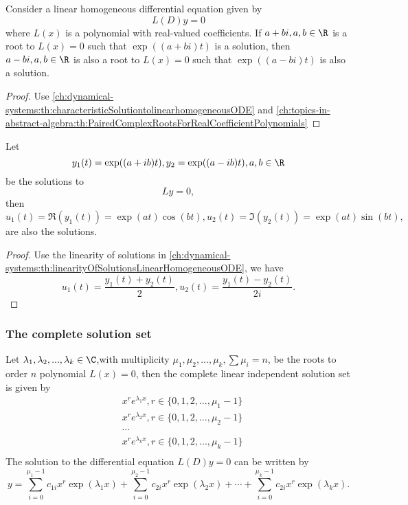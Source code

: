 \begin{refsection}
\begin{lemma}
Consider a linear homogeneous differential equation given by
$$L(D)y = 0$$	
where $L(x)$ is a polynomial with real-valued coefficients. 
If $a+bi,a,b\in \R$ is a root to $L(x) = 0$ such that $\exp((a+bi)t)$ is a solution, then
 $a-bi,a,b\in \R$ is also a root to $L(x) = 0$ such that $\exp((a-bi)t)$ is also a solution.
\end{lemma}
\begin{proof}
Use	
\autoref{ch:dynamical-systems:th:characteristicSolutiontolinearhomogeneousODE} and \autoref{ch:topics-in-abstract-algebra:th:PairedComplexRootsForRealCoefficientPolynomials}
\end{proof}



\begin{lemma}\label{ch:dynamical-systems:th:ConversionTrigonometricFunctionsAndComplexExponentialsHomogeneousEquations} 
Let
$$y_1(t)=\exp((a+ib)t),y_2=\exp((a-ib)t),a,b\in \R$$	
be the solutions to 
$$Ly = 0,$$
then
$$u_1(t) =\Re(y_1(t))= \exp(at)\cos(bt), u_2(t)= \Im(y_2(t)) = \exp(at)\sin(bt),$$
are also the solutions.	
\end{lemma}
\begin{proof}
Use the linearity of solutions in \autoref{ch:dynamical-systems:th:linearityOfSolutionsLinearHomogeneousODE}, we have
$$u_1(t) = \frac{y_1(t) + y_2(t)}{2},u_2(t) = \frac{y_1(t) - y_2(t)}{2i}.$$
\end{proof}

\subsubsection{The complete solution set}
\begin{theorem}\cite[49]{sanchez1968ordinary}
Let $\lambda_1,\lambda_2,...,\lambda_k \in \C$,with multiplicity $\mu_1,\mu_2,...,\mu_k, \sum \mu_i = n$, be the roots to order $n$ polynomial $L(x) = 0$, then the complete linear independent solution set is given by
\begin{align*}
	&x^re^{\lambda_1 x}, r\in \{0,1,2,...,\mu_1-1\} \\
	&x^re^{\lambda_2 x}, r\in \{0,1,2,...,\mu_2-1\} \\
	&\cdots \\
	&x^re^{\lambda_k x}, r\in \{0,1,2,...,\mu_k-1\} \\
\end{align*} 
The solution to the differential equation $L(D)y = 0$ can be written by
$$y = \sum_{i=0}^{\mu_1-1} c_{1i} x^r\exp(\lambda_1 x) + \sum_{i=0}^{\mu_2-1} c_{2i} x^r\exp(\lambda_2 x) + \cdots + \sum_{i=0}^{\mu_k-1} c_{2i} x^r\exp(\lambda_k x).$$
\end{theorem}


\end{refsection}
